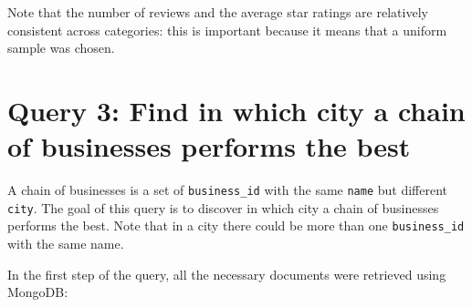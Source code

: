 \documentclass{Configuration_Files/PoliMi3i_thesis}
\begin{document}
Note that the number of reviews and the average star ratings are relatively consistent across categories: this is important because it means that a uniform sample was chosen. 

\section{Query 3: Find in which city a chain of businesses performs the best}
A chain of businesses is a set of \texttt{business\_id} with the same \texttt{name} but different \texttt{city}. The goal of this query is to discover in which city a chain of businesses performs the best. Note that in a city there could be more than one \texttt{business\_id} with the same name.

In the first step of the query, all the necessary documents were retrieved using MongoDB:
\end{document}
